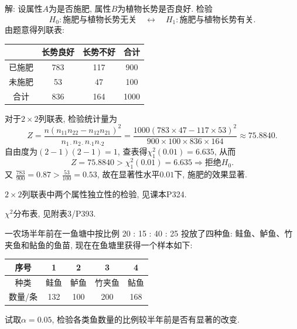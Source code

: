 \documentclass[standard]{ExBook}
\renewenvironment{shaded}{%
  \def\FrameCommand{\fboxsep=\FrameSep \colorbox{shadecolor}}%
  \MakeFramed{\advance\hsize-\width \FrameRestore}%
}{%
  \endMakeFramed
}
\begin{document}
\begin{qitems}
\vspace{\dimexpr2.5cm-5em\relax}

解: 设属性$A$为是否施肥, 属性$B$为植物长势是否良好. 检验
$$
H_0:\text{施肥与植物长势无关}
\quad\leftrightarrow\quad
H_1:\text{施肥与植物长势有关}.
$$
由题意得列联表:
\begin{center}
\setlength{\tabcolsep}{28pt}
\begin{tabular}{c|cc|c}
\hline
 & 长势良好 & 长势不好 & 合计\\
\hline
已施肥 & 783 & 117 & 900\\
未施肥 & 53 & 47 & 100\\
\hline
合计 & 836 & 164 & 1000\\
\hline
\end{tabular}
\end{center}
对于$2\times2$列联表, 检验统计量为
$$
Z
=\frac{n(n_{11}n_{22}-n_{12}n_{21})^2}
{n_{1\cdot}n_{2\cdot}n_{\cdot1}n_{\cdot2}}
=\frac{1000(783\times47-117\times53)^2}
{900\times100\times836\times164}
\approx75.8840.
$$
自由度为$(2-1)(2-1)=1$, 查表得$\chi_1^2(0.01)=6.635$, 从而
$$
Z=75.8840>\chi_1^2(0.01)=6.635
\Longrightarrow
\text{拒绝}H_0.
$$
又
$
\frac{783}{900}=0.87>\frac{53}{100}=0.53
$,
故在显著性水平$0.01$下, 施肥的效果显著.

\textcolor{themeColor}{\selectfont {} $2\times2$列联表中两个属性独立性的检验, 见课本P324.}

\textcolor{themeColor}{\selectfont {} $\chi^2$分布表, 见附表3/P393.}

\vspace{2.5cm-5em}

    \begin{bbox}
    \begin{shaded}
        \qitem
一农场半年前在一鱼塘中按比例 20 : 15 : 40 : 25 投放了四种鱼: 鲑鱼、鲈鱼、竹夹鱼和鲇鱼的鱼苗, 现在在鱼塘里获得一个样本如下:
\begin{center}
\setlength{\tabcolsep}{32pt}
\begin{tabular}{c|cccc}
\hline
序号 & 1 & 2 & 3 & 4 \\
\hline
种类 & 鲑鱼 & 鲈鱼 & 竹夹鱼 & 鲇鱼 \\
\hline
数量/条 & 132 & 100 & 200 & 168 \\
\hline
\end{tabular}
\end{center}
试取$\alpha=0.05$, 检验各类鱼数量的比例较半年前是否有显著的改变.
    \end{shaded}
    \end{bbox}


\end{qitems}
\end{document}
